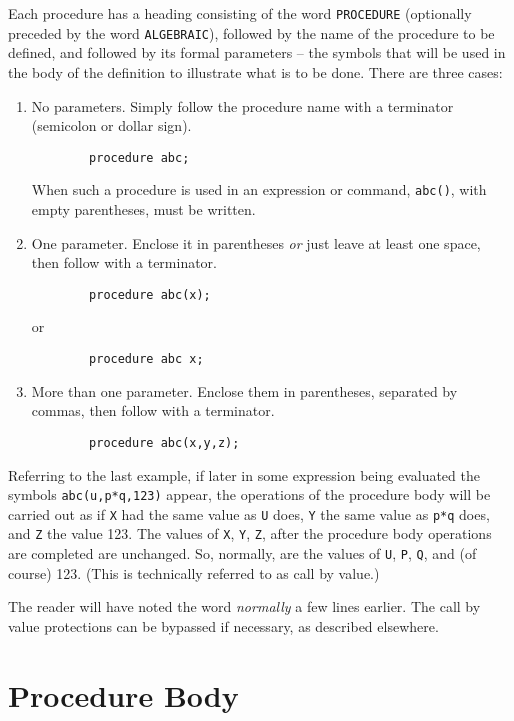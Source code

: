 \documentclass[11pt,letterpaper]{book}
\begin{document}
Each procedure has a heading consisting of the word {\tt PROCEDURE}
(optionally preceded by the word {\tt ALGEBRAIC}), followed by the name of
the procedure to be defined, and followed by its formal parameters -- the
symbols that will be used in the body of the definition to illustrate
what is to be done.  There are three cases:
\begin{enumerate}
\item No parameters. Simply follow the procedure name with a terminator
(semicolon or dollar sign).
{\small\begin{verbatim}
        procedure abc;
\end{verbatim}}

When such a procedure is used in an expression or command, {\tt abc()}, with
empty parentheses, must be written.

\item One parameter.  Enclose it in parentheses {\em or\/} just leave at
least one space, then follow with a terminator.
{\small\begin{verbatim}
        procedure abc(x);
\end{verbatim}}
or
{\small\begin{verbatim}
        procedure abc x;
\end{verbatim}}

\item More than one parameter. Enclose them in parentheses, separated by
commas, then follow with a terminator.
{\small\begin{verbatim}
        procedure abc(x,y,z);
\end{verbatim}}
\end{enumerate}
Referring to the last example, if later in some expression being evaluated
the symbols {\tt abc(u,p*q,123)} appear, the operations of the procedure
body will be carried out as if {\tt X} had the same value as {\tt U} does,
{\tt Y} the same value as {\tt p*q} does, and {\tt Z} the value 123.  The
values of {\tt X}, {\tt Y}, {\tt Z}, after the procedure body operations
are completed are unchanged.  So, normally, are the values of {\tt U},
{\tt P}, {\tt Q}, and (of course) 123. (This is technically referred to as
call by value.)

The reader will have noted the word {\em normally\/} a few lines earlier. The
call by value protections can be bypassed if necessary, as described
elsewhere.

\section{Procedure Body}
\end{document}
